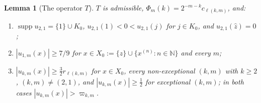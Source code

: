 \documentclass[10pt]{amsart}
\newtheorem{lemma}[theorem]{Lemma}
\theoremstyle{definition}
\theoremstyle{remark}
\newcommand{\supp}{\operatorname{supp}}
\newcommand{\N}{\mathbb N}
\newcommand{\zh}{\hat z}
\begin{document}
\begin{lemma}[The operator $T$]\label{lem:T}
$T$ is admissible, $\Phi_m(k)=2^{-m-k}c_{\ell(k,m)}$, and:
\begin{enumerate}
\item[(P1)] $\supp u_{2,1}=\{1\}\cup K_0$, $u_{2,1}(1)<0<u_{2,1}(j)$ for
$j\in K_0$, and $u_{2,1}(\zh)=0$;
\item[(P2)] $|u_{1,m}(x)|\ge7/9$ for $x\in X_0:=\{\zh\}\cup\{x^{(n)}:n\in\N\}$
and every $m$;
\item[(P3)] $|u_{k,m}(x)|\ge\frac32r_{\ell(k,m)}$ for $x\in X_0$, every
non-exceptional $(k,m)$ with $k\ge2$, $(k,m)\ne(2,1)$, and
$|u_{k,m}(x)|\ge\frac12$ for exceptional $(k,m)$; in both cases
$|u_{k,m}(x)|>\varpi_{k,m}$.
\end{enumerate}
\end{lemma}
\end{document}
